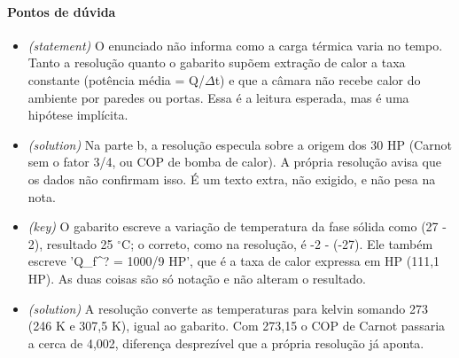 \documentclass{article}%
\begin{document}
\paragraph{Pontos de dúvida}%
\begin{itemize}%
\item%
\textit{(statement)} O enunciado não informa como a carga térmica varia no tempo. Tanto a resolução quanto o gabarito supõem extração de calor a taxa constante (potência média = Q/$\Delta$t) e que a câmara não recebe calor do ambiente por paredes ou portas. Essa é a leitura esperada, mas é uma hipótese implícita.%
\item%
\textit{(solution)} Na parte b, a resolução especula sobre a origem dos 30 HP (Carnot sem o fator 3/4, ou COP de bomba de calor). A própria resolução avisa que os dados não confirmam isso. É um texto extra, não exigido, e não pesa na nota.%
\item%
\textit{(key)} O gabarito escreve a variação de temperatura da fase sólida como (27 - 2), resultado 25 $^\circ$C; o correto, como na resolução, é -2 - (-27). Ele também escreve 'Q\_f\^{}? = 1000/9 HP', que é a taxa de calor expressa em HP (111,1 HP). As duas coisas são só notação e não alteram o resultado.%
\item%
\textit{(solution)} A resolução converte as temperaturas para kelvin somando 273 (246 K e 307,5 K), igual ao gabarito. Com 273,15 o COP de Carnot passaria a cerca de 4,002, diferença desprezível que a própria resolução já aponta.%
\end{itemize}%
\end{document}
